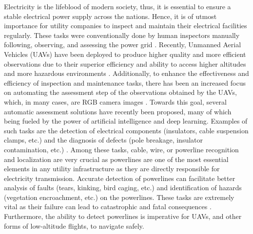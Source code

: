 \documentclass[journal]{IEEEtran}
\begin{document}
% 
% 
% 
% 
Electricity is the lifeblood of modern society, thus, it is essential to ensure a stable electrical power supply across the nations. Hence, it is of utmost importance for utility companies to inspect and maintain their electrical facilities regularly. These tasks were conventionally done by human inspectors manually following, observing, and assessing the power grid \cite{9225728}. Recently, Unmanned Aerial Vehicles (UAVs) have been deployed to produce higher quality and more efficient observations due to their superior efficiency and ability to access higher altitudes and more hazardous environments \cite{Deng2014UnmannedAV}. Additionally, to enhance the effectiveness and efficiency of inspection and maintenance tasks, there has been an increased focus on automating the assessment step of the observations obtained by the UAVs, which, in many cases, are RGB camera images \cite{nhan_examples}. Towards this goal, several automatic assessment solutions have recently been proposed, many of which being fueled by the power of artificial intelligence and deep learning. Examples of such tasks are the detection of electrical components (insulators, cable suspension clamps, etc.) and the diagnosis of defects (pole breakage, insulator contamination, etc.) \cite{nhan_examples, insulator_examples,detect_component_examples}. Among these tasks, cable, wire, or powerline recognition and localization are very crucial as powerlines are one of the most essential elements in any utility infrastructure as they are directly responsible for electricity transmission. Accurate detection of powerlines can facilitate better analysis of faults (tears, kinking, bird caging, etc.) and identification of hazards (vegetation encroachment, etc.) on the powerlines. These tasks are extremely vital as their failure can lead to catastrophic and fatal consequences \cite{pge_bankruptcy}. Furthermore, the ability to detect powerlines is imperative for UAVs, and other forms of low-altitude flights, to navigate safely.
\end{document}
